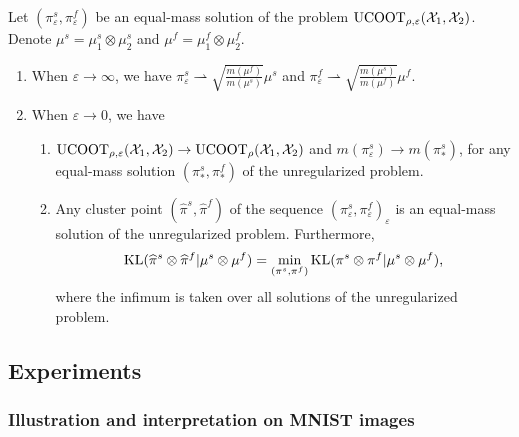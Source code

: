 \begin{proposition}
  \label{prop:convergence_minimiser_unbalanced}
  Let $(\pi_{\varepsilon}^s, \pi_{\varepsilon}^f)$ be an equal-mass solution of the problem
  $\text{UCOOT}_{\rho, \varepsilon}(\mathcal X_1, \mathcal X_2)$. Denote $\mu^s = \mu_1^s \otimes \mu_2^s$
  and $\mu^f = \mu_1^f \otimes \mu_2^f$.
  \begin{enumerate}
    \item When $\varepsilon \to \infty$, we have $\pi_{\varepsilon}^s \rightharpoonup
    \sqrt{\frac{m(\mu^f)}{m(\mu^s)}} \mu^s$
    and $\pi_{\varepsilon}^f \rightharpoonup \sqrt{\frac{m(\mu^s)}{m(\mu^f)}} \mu^f$.

    \item When $\varepsilon \to 0$, we have
    \begin{enumerate}
      \item $\text{UCOOT}_{\rho, \varepsilon}(\mathcal X_1, \mathcal X_2) \to \text{UCOOT}_{\rho}(\mathcal X_1, \mathcal X_2)$ and
      $m(\pi_{\varepsilon}^s) \to m(\pi_*^s)$, for any equal-mass solution
      $(\pi_*^s, \pi_*^f)$ of the unregularized problem.

      \item Any cluster point $(\widehat{\pi}^s, \widehat{\pi}^f)$ of the sequence
      $(\pi_{\varepsilon}^s, \pi_{\varepsilon}^f)_{\varepsilon}$ is an equal-mass
      solution of the unregularized problem. Furthermore,
      \begin{equation}
        \text{KL}(\widehat{\pi}^s \otimes \widehat{\pi}^f | \mu^s \otimes \mu^f) =
        \min_{(\pi^s, \pi^f)} \text{KL}(\pi^s \otimes \pi^f \vert \mu^s \otimes \mu^f),
      \end{equation}
      where the infimum is taken over all solutions of the unregularized problem.
    \end{enumerate}
  \end{enumerate}
\end{proposition}

\subsection{Experiments} \label{sec:experiments}
\subsubsection{Illustration and interpretation on MNIST images}

